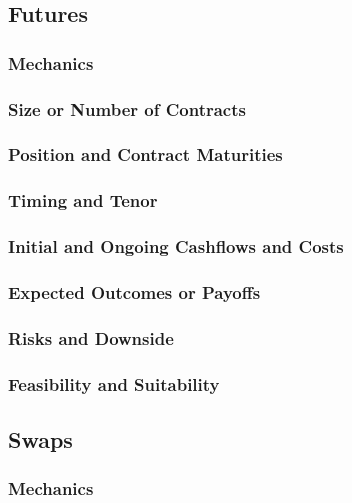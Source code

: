 \documentclass[11pt, a4paper, british]{article}
\begin{document}
\newpage

\subsection{Futures}

\subsubsection{Mechanics}

\subsubsection{Size or Number of Contracts}

\subsubsection{Position and Contract Maturities}

\subsubsection{Timing and Tenor}

\subsubsection{Initial and Ongoing Cashflows and Costs}

\subsubsection{Expected Outcomes or Payoffs}

\subsubsection{Risks and Downside}

\subsubsection{Feasibility and Suitability}

\newpage

\subsection{Swaps}

\subsubsection{Mechanics}
\end{document}
